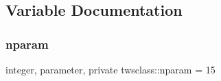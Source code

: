 \subsection{Variable Documentation}
\mbox{\label{namespacetwsclass_ae92106a92b2952cbb34ae48df4c6b375}} 
\subsubsection{\texorpdfstring{nparam}{nparam}}
{\footnotesize\ttfamily integer, parameter, private twsclass\+::nparam = 15\hspace{0.3cm}{\ttfamily [private]}}

